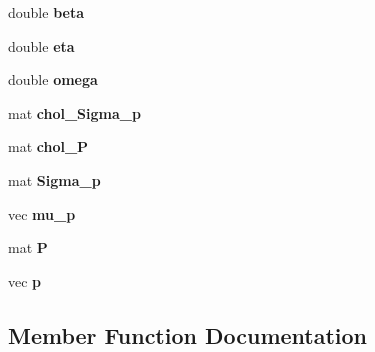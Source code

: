 \begin{DoxyCompactItemize}
\item 
double {\bfseries beta}\hypertarget{classMore_afcb6713d1144080cbd73c086e6312b8c}{}\label{classMore_afcb6713d1144080cbd73c086e6312b8c}

\item 
double {\bfseries eta}\hypertarget{classMore_a3bb07053d6041a83a326541f3fb45546}{}\label{classMore_a3bb07053d6041a83a326541f3fb45546}

\item 
double {\bfseries omega}\hypertarget{classMore_adc2f0c4c8b8eccea6306879a4d274eb0}{}\label{classMore_adc2f0c4c8b8eccea6306879a4d274eb0}

\item 
mat {\bfseries chol\+\_\+\+Sigma\+\_\+p}\hypertarget{classMore_a069da105929f0494703ffb24f86e6ad8}{}\label{classMore_a069da105929f0494703ffb24f86e6ad8}

\item 
mat {\bfseries chol\+\_\+P}\hypertarget{classMore_adf80f265d7973f2b1fee9385c0e4dc8c}{}\label{classMore_adf80f265d7973f2b1fee9385c0e4dc8c}

\item 
mat {\bfseries Sigma\+\_\+p}\hypertarget{classMore_a713ece9bc8bb8a52be429a3aa6fb0bd1}{}\label{classMore_a713ece9bc8bb8a52be429a3aa6fb0bd1}

\item 
vec {\bfseries mu\+\_\+p}\hypertarget{classMore_a0fede37a2f86a367d6ffeeee404e65e2}{}\label{classMore_a0fede37a2f86a367d6ffeeee404e65e2}

\item 
mat {\bfseries P}\hypertarget{classMore_a93fd420d0058b710cabaf6c15ff65ba4}{}\label{classMore_a93fd420d0058b710cabaf6c15ff65ba4}

\item 
vec {\bfseries p}\hypertarget{classMore_a89e33f9ae22902ed11d732bb56439721}{}\label{classMore_a89e33f9ae22902ed11d732bb56439721}

\end{DoxyCompactItemize}


\subsection{Member Function Documentation}
